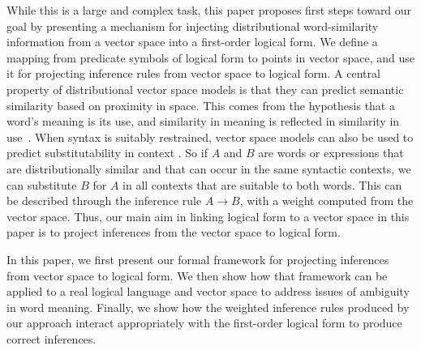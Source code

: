 While this is a large and complex task, this paper proposes first steps toward
our goal by presenting a mechanism for injecting distributional word-similarity
information from a vector space into a first-order logical form.  We
define a mapping from predicate symbols of logical form to points in
vector space, and use it for projecting inference rules from vector
space to logical form. %
A central property of distributional vector space models is that they
can predict semantic similarity based on proximity in space.  This comes from
the hypothesis that a word's meaning is its use, and similarity in
meaning is reflected in similarity in use~\citep{Wittgenstein,firth:slaj1957,harris:wj1954}. When syntax is suitably restrained, vector space models can
also be used to predict substitutability in context
\citep{lin:nlej2001,mitchell:acl2008,erk:emnlp2008,thater:acl2010,reisinger:naacl2010,dinu:emnlp2010,vandecruys:emnlp2011}.
So if $A$ and $B$ are words or
expressions that are distributionally similar and that can occur in
the same syntactic contexts, we can substitute $B$ for $A$ in all
contexts that are suitable to both words. This can be described
through the inference rule $A \to B$, with a weight computed from the
vector space. Thus, our main aim in linking logical form to a vector
space in this paper is to project inferences from the vector space to
logical form.

In this paper, we first present our formal framework for projecting inferences
from vector space to logical form.  We then show how that framework can be
applied to a real logical language and vector space to address issues of
ambiguity in word meaning.  Finally, we show how the weighted inference rules
produced by our approach interact appropriately with the first-order logical
form to produce correct inferences.
